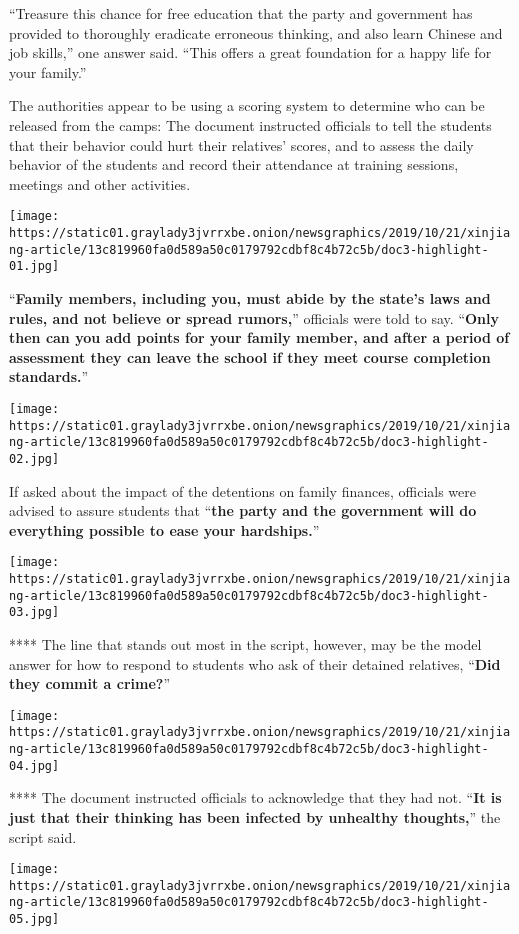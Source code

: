 ``Treasure this chance for free education that the party and government
has provided to thoroughly eradicate erroneous thinking, and also learn
Chinese and job skills,'' one answer said. ``This offers a great
foundation for a happy life for your family.''

The authorities appear to be using a scoring system to determine who can
be released from the camps: The document instructed officials to tell
the students that their behavior could hurt their relatives' scores, and
to assess the daily behavior of the students and record their attendance
at training sessions, meetings and other activities.

\texttt{[image: https://static01.graylady3jvrrxbe.onion/newsgraphics/2019/10/21/xinjiang-article/13c819960fa0d589a50c0179792cdbf8c4b72c5b/doc3-highlight-01.jpg]}

``\textbf{Family members, including you, must abide by the state's laws
and rules, and not believe or spread rumors,}'' officials were told to
say. ``\textbf{Only then can you add points for your family member, and
after a period of assessment they can leave the school if they meet
course completion standards.}''

\texttt{[image: https://static01.graylady3jvrrxbe.onion/newsgraphics/2019/10/21/xinjiang-article/13c819960fa0d589a50c0179792cdbf8c4b72c5b/doc3-highlight-02.jpg]}

If asked about the impact of the detentions on family finances,
officials were advised to assure students that ``\textbf{the party and
the government will do everything possible to ease your hardships.}''

\texttt{[image: https://static01.graylady3jvrrxbe.onion/newsgraphics/2019/10/21/xinjiang-article/13c819960fa0d589a50c0179792cdbf8c4b72c5b/doc3-highlight-03.jpg]}

 **** The line that stands out most in the script, however, may be the
model answer for how to respond to students who ask of their detained
relatives, ``\textbf{Did they commit a crime?}''

\texttt{[image: https://static01.graylady3jvrrxbe.onion/newsgraphics/2019/10/21/xinjiang-article/13c819960fa0d589a50c0179792cdbf8c4b72c5b/doc3-highlight-04.jpg]}

 **** The document instructed officials to acknowledge that they had
not. ``\textbf{It is just that their thinking has been infected by
unhealthy thoughts,}'' the script said.

\texttt{[image: https://static01.graylady3jvrrxbe.onion/newsgraphics/2019/10/21/xinjiang-article/13c819960fa0d589a50c0179792cdbf8c4b72c5b/doc3-highlight-05.jpg]}

